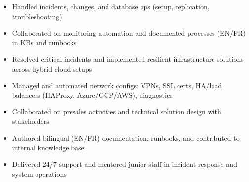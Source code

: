 \documentclass[10pt,a4paper,ragged2e,withhyper]{altacv}
\begin{document}
\begin{paracol}{2}
\begin{itemize}
\item Handled incidents, changes, and database ops (setup, replication, troubleshooting)

\item Collaborated on monitoring automation and documented processes (EN/FR) in KBs and runbooks

\end{itemize}

\divider

\begin{itemize}
\item Resolved critical incidents and implemented resilient infrastructure solutions across hybrid cloud setups
\item Managed and automated network configs: VPNs, SSL certs, HA/load balancers (HAProxy, Azure/GCP/AWS), diagnostics
\item Collaborated on presales activities and technical solution design with stakeholders
\item Authored bilingual (EN/FR) documentation, runbooks, and contributed to internal knowledge base
\item Delivered 24/7 support and mentored junior staff in incident response and system operations
\end{itemize}

\switchcolumn



\end{paracol}
\end{document}
